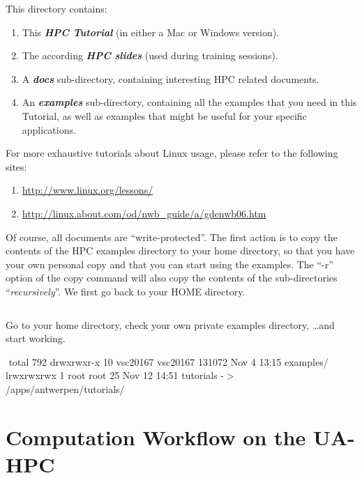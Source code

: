 This directory contains:

\begin{enumerate}
  \item This \textbf{\textit{HPC Tutorial}} (in either a Mac or Windows
    version).
  \item The according \textbf{\textit{HPC slides}} (used during training
    sessions).
  \item A \textbf{\textit{docs}} sub-directory, containing interesting HPC
    related documents.
  \item An \textbf{\textit{examples}} sub-directory, containing all the
    examples that you need in this Tutorial, as well as examples that might be
    useful for your specific applications.
\end{enumerate}

\textbf{} For more exhaustive tutorials about Linux usage,
please refer to the following sites:

\begin{enumerate}
  \item \url{http://www.linux.org/lessons/}
  \item \url{http://linux.about.com/od/nwb\_guide/a/gdenwb06.htm}
\end{enumerate}

Of course, all documents are ``write-protected''. The first action is to copy
the contents of the HPC examples directory to your home directory, so that you
have your own personal copy and that you can start using the examples. The
``-r'' option of the copy command will also copy the contents of the
sub-directories ``\textit{recursively}''.  We first go back to your HOME
directory.

\begin{prompt}
$ %
$ %
\end{prompt}

Go to your home directory, check your own private examples directory, \dots  and start working.

\begin{prompt}
$ %
$ %
total 792
drwxrwxr-x 10 vsc20167 vsc20167 131072 Nov  4 13:15 examples/
lrwxrwxrwx 1  root     root         25 Nov 12 14:51 tutorials -$>$ /apps/antwerpen/tutorials/
\end{prompt}

\section{Computation Workflow on the UA-HPC}
\label{sec:compuation-workflow-on-the-hpc}

